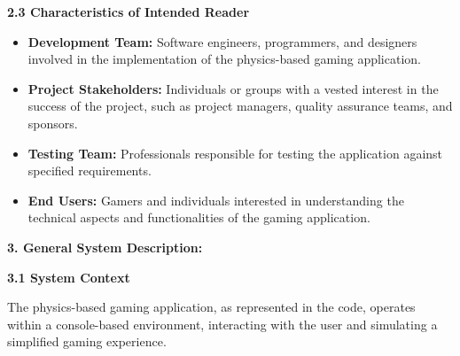\documentclass[
]{article}
\begin{document}
\textbf{2.3 Characteristics of Intended Reader}

\begin{itemize}
\item
  \textbf{Development Team:} Software engineers, programmers, and
  designers involved in the implementation of the physics-based gaming
  application.
\item
  \textbf{Project Stakeholders:} Individuals or groups with a vested
  interest in the success of the project, such as project managers,
  quality assurance teams, and sponsors.
\item
  \textbf{Testing Team:} Professionals responsible for testing the
  application against specified requirements.
\item
  \textbf{End Users:} Gamers and individuals interested in understanding
  the technical aspects and functionalities of the gaming application.
\end{itemize}

\textbf{3. General System Description:}

\textbf{3.1 System Context}

The physics-based gaming application, as represented in the code,
operates within a console-based environment, interacting with the user
and simulating a simplified gaming experience.
\end{document}
